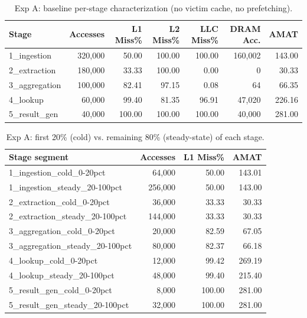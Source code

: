 \begin{table}[H]\centering\small
\begin{tabular}{lrrrrrr}\toprule
Stage & Accesses & L1 Miss\% & L2 Miss\% & LLC Miss\% & DRAM Acc. & AMAT \\ \midrule
1\_ingestion & 320,000 & 50.00 & 100.00 & 100.00 & 160,002 & 143.00 \\
2\_extraction & 180,000 & 33.33 & 100.00 & 0.00 & 0 & 30.33 \\
3\_aggregation & 100,000 & 82.41 & 97.15 & 0.08 & 64 & 66.35 \\
4\_lookup & 60,000 & 99.40 & 81.35 & 96.91 & 47,020 & 226.16 \\
5\_result\_gen & 40,000 & 100.00 & 100.00 & 100.00 & 40,000 & 281.00 \\
\bottomrule\end{tabular}
\caption{Exp A: baseline per-stage characterization (no victim cache, no prefetching).}
\label{tab:expA}\end{table}

\begin{table}[H]\centering\small
\begin{tabular}{lrrr}\toprule
Stage segment & Accesses & L1 Miss\% & AMAT \\ \midrule
1\_ingestion\_cold\_0-20pct & 64,000 & 50.00 & 143.01 \\
1\_ingestion\_steady\_20-100pct & 256,000 & 50.00 & 143.00 \\
2\_extraction\_cold\_0-20pct & 36,000 & 33.33 & 30.33 \\
2\_extraction\_steady\_20-100pct & 144,000 & 33.33 & 30.33 \\
3\_aggregation\_cold\_0-20pct & 20,000 & 82.59 & 67.05 \\
3\_aggregation\_steady\_20-100pct & 80,000 & 82.37 & 66.18 \\
4\_lookup\_cold\_0-20pct & 12,000 & 99.42 & 269.19 \\
4\_lookup\_steady\_20-100pct & 48,000 & 99.40 & 215.40 \\
5\_result\_gen\_cold\_0-20pct & 8,000 & 100.00 & 281.00 \\
5\_result\_gen\_steady\_20-100pct & 32,000 & 100.00 & 281.00 \\
\bottomrule\end{tabular}
\caption{Exp A: first 20\% (cold) vs. remaining 80\% (steady-state) of each stage.}
\label{tab:expA-cold}\end{table}

